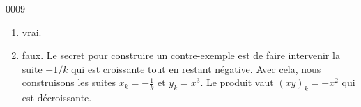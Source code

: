 
\begin{corrige}{0009}

\begin{enumerate}
\item vrai.
\item faux. Le secret pour construire un contre-exemple est de faire intervenir la suite $-1/k$ qui est croissante tout en restant négative. Avec cela, nous construisons les suites $x_k=-\frac{1}{ k }$ et $y_k=x^3$. Le produit vaut $(xy)_k=-x^2$ qui est décroissante. 
\end{enumerate}

\end{corrige}

